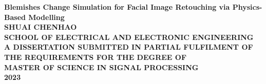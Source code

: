 \begin{titlepage}
\begin{center}
\vspace*{2in}
\Huge{\textbf{Blemishes Change Simulation for Facial Image Retouching via Physics-Based Modelling}}\\[2.2in]

\LARGE{\textbf{\MakeUppercase{Shuai Chenhao}}}\\[1in]

\normalsize{\textbf{\MakeUppercase{SCHOOL OF ELECTRICAL AND ELECTRONIC ENGINEERING}}}\\[0.5in]
\normalsize{\textbf{\MakeUppercase{A DISSERTATION SUBMITTED IN PARTIAL FULFILMENT OF\\THE REQUIREMENTS FOR THE DEGREE OF\\MASTER OF SCIENCE IN SIGNAL PROCESSING}}}\\[0.75in]
\large{\textbf{2023}}
\end{center}
\end{titlepage}
\newpage